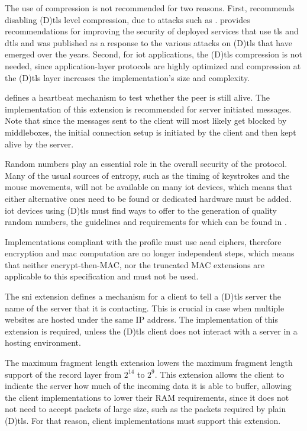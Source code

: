 \documentclass{llncs}
\begin{document}
The use of compression is not recommended for two reasons. First, \cite{RFC7525}
recommends disabling (D)\gls{tls} level compression, due to attacks such as \cite{Microsof72:online}.
 provides recommendations for improving the security of deployed services
that use \gls{tls} and \gls{dtls} and was published as a response to the various
attacks on (D)\gls{tls} that have emerged over the years. Second, for \gls{iot} applications,
the (D)\gls{tls} compression is not needed, since application-layer protocols are highly
optimized and compression at the (D)\gls{tls} layer increases the implementation's size and complexity.

\cite{RFC6520} defines a heartbeat mechanism to test whether the peer
is still alive. The implementation of this extension is recommended for server
initiated messages. Note that since the messages sent to the client will most likely
get blocked by middleboxes, the initial connection setup is initiated by the
client and then kept alive by the server.

Random numbers play an essential role in the overall security of the protocol.
Many of the usual sources of entropy, such as the timing of keystrokes and the
mouse movements, will not be available on many \gls{iot} devices, which means that
either alternative ones need to be found or dedicated hardware must be added.
\gls{iot} devices using (D)\gls{tls} must find ways to offer to the generation of quality
random numbers, the guidelines and requirements for which can be found in \cite{rfc4086}.

Implementations compliant with the profile must use \gls{aead} ciphers, therefore
encryption and \gls{mac} computation are no longer independent steps, which means
that neither encrypt-then-MAC\cite{RFC7366}, nor the truncated MAC\cite{RFC6066} extensions are applicable
to this specification and must not be used.

The \gls{sni} extension\cite{RFC6066} defines a mechanism for a client to
tell a (D)\gls{tls} server the name of the server that it is contacting. This is
crucial in case when multiple websites are hosted under the same IP address.
The implementation of this extension is required, unless the (D)\gls{tls}
client does not interact with a server in a hosting environment.

The maximum fragment length extension\cite{RFC6066} lowers the maximum fragment
length support of the record layer from $2^14$ to $2^9$. This extension allows
the client to indicate the server how much of the incoming data it is able to buffer,
allowing the client implementations to lower their RAM requirements, since it does not
not need to accept packets of large size, such as the  packets required by
plain (D)\gls{tls}. For that reason, client implementations must support this
extension.
\end{document}

